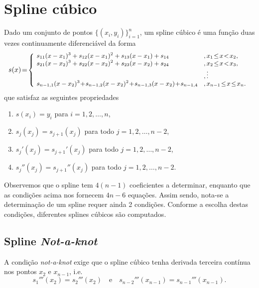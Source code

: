 \emconstrucao

\section{Spline cúbico}\label{cap_interp_splines}

Dado um conjunto de pontos $\{(x_i,y_i)\}_{i=1}^n$, um spline cúbico é uma função duas vezes continuamente diferenciável da forma
\begin{equation}
  \begin{small}
    s(x)\!=\!\left\{
      \begin{array}{ll}
        \!s_{11}(x-x_1)^3 + s_{12}(x-x_1)^2 + s_{13}(x-x_1) + s_{14} &,x_1\!\leq\!x\!<\!x_2,\\
        \!s_{21}(x-x_2)^3 + s_{22}(x-x_2)^2 + s_{23}(x-x_2) + s_{24} &,x_2\!\leq\!x\!<\!x_3,\\
                                                                   &, \vdots \\
        \!s_{n-1,1}(x-x_2)^3\!+\!s_{n-1,2}(x-x_2)^2\!+\!s_{n-1,3}(x-x_2)\!+\!s_{n-1,4}\!&,x_{n-1}\!\leq\!x\!\leq\!x_n.
      \end{array}
    \right.
  \end{small}
\end{equation}
que satisfaz as seguintes propriedades
\begin{enumerate}
\item $s(x_i) = y_i$ para $i=1, 2, \dotsc, n$,
\item $s_j(x_j) = s_{j+1}(x_j)$ para todo $j=1,2,\dotsc,n-2$,
\item $s_j'(x_j) = s_{j+1}'(x_j)$ para todo $j=1,2,\dotsc,n-2$,  
\item $s_j''(x_j) = s_{j+1}''(x_j)$ para todo $j=1,2,\dotsc,n-2$.
\end{enumerate}

Observemos que o spline tem $4(n-1)$ coeficientes a determinar, enquanto que as condições acima nos fornecem $4n-6$ equações. Assim sendo, nota-se a determinação de um spline requer ainda 2 condições. Conforme a escolha destas condições, diferentes splines cúbicos são computados.

\subsection{Spline {\it Not-a-knot}}

A condição {\it not-a-knot} exige que o spline cúbico tenha derivada terceira contínua nos pontos $x_2$ e $x_{n-1}$, i.e.
\begin{equation}
  s_1'''(x_2) = s_2'''(x_2)\quad\text{e}\quad s_{n-2}'''(x_{n-1}) = s_{n-1}'''(x_{n-1}).
\end{equation}

